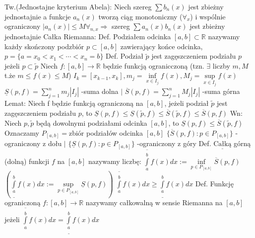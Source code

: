 \documentclass{article}
\begin{document}
Tw.(Jednostajne kryterium Abela): Niech szereg $\sum b_n(x)$ jest zbieżny jednostajnie a funkcje $a_n(x)$ tworzą ciąg monotoniczny ($\forall_x$)
i wspólnie ograniczony $|a_n(x)|\le M \forall_{n,x}\Rightarrow$ szereg $\sum a_n(x)b_n(x)$ jest zbieżny jednostajnie\newline\newline
Całka Riemanna:\newline
Def. Podziałem odcinka $[a,b]\subset\mathbb{R}$ nazywamy każdy skończony podzbiór $p\subset[a,b]$ zawierający końce odcinka, $p=\{a=x_0<x_1<\cdots<x_n=b\}$\newline
Def. Podział $\widetilde{p}$ jest zagęszczeniem podziału $p$ jeżeli $p\subset \widetilde{p}$\newline
Niech $f:[a,b]\rightarrow\mathbb{R}$ będzie funkcją ogranicczoną (tzn. $\exists$ liczby $m,M$ t.że $m\le f(x)\le M$)\newline
$I_k=[x_{k-1},x_k], m_j=\inf\limits_{x\in I_j}f(x),M_j=\sup\limits_{x\in I_j}f(x)$\newline
$\underline{S}(p,f)=\sum\limits_{j=1}^{n}m_j|I_j|$ -suma dolna $|$ $\overline{S}(p,f)=\sum\limits_{j=1}^{n}M_j|I_j|$ -suma górna\newline
Lemat: Niech f będzie funkcją ograniczoną na $[a,b]$, jeżeli podział $\widetilde{p}$ jest zagęszczeniem podziału $p$, to
$\underline{S}(p,f)\le\underline{S}(\widetilde{p},f)\le\overline{S}(\widetilde{p},f)\le\overline{S}(p,f)$\newline
Wn: Niech $p,\widetilde{p}$ będą dowolnymi podziałami odcinka $[a,b]$, to $\underline{S}(p,f)\le\overline{S}(\widetilde{p},f)$\newline
Oznaczamy $P_{[a,b]}=$zbiór podziałów odcinka $[a,b]$\newline
$\{\overline{S}(p,f):p\in P_{[a,b]}\}$ -ograniczony z dołu $|$ $\{\underline{S}(p,f):p\in P_{[a,b]}\}$ -ograniczony z góry\newline
Def. $\underline{\text{Całką}}$ górną (dolną) funkcji $f$ na $[a,b]$ nazywamy liczbę:
$\overline{\int\limits_{a}^{b}}f(x)dx:=\inf\limits_{p\in P_{[a,b]}}\overline{S}(p,f)$
$\left(\underline{\int\limits_{a}^{b}}f(x)dx:=\sup\limits_{p\in P_{[a,b]}}\underline{S}(p,f)\right)$
$\overline{\int\limits_{a}^{b}}f(x)dx\ge\underline{\int\limits_{a}^{b}}f(x)dx$\newline
Def. Funkcję ograniczoną $f:[a,b]\rightarrow\mathbb{R}$ nazywamy całkowalną w sensie Riemanna na $[a,b]$ jeżeli
$\overline{\int\limits_{a}^{b}}f(x)dx=\underline{\int\limits_{a}^{b}}f(x)dx$\newline
\end{document}
